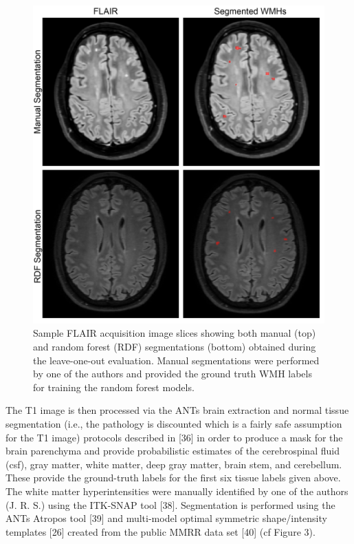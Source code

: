 \documentclass[11pt,]{article}
\begin{document}
\begin{figure}[htbp]
\centering
\includegraphics{Figures/montage.png}
\caption{Sample FLAIR acquisition image slices showing both manual (top)
and random forest (RDF) segmentations (bottom) obtained during the
leave-one-out evaluation. Manual segmentations were performed by one of
the authors and provided the ground truth WMH labels for training the
random forest models.}
\end{figure}

The T1 image is then processed via the ANTs brain extraction and normal
tissue segmentation (i.e., the pathology is discounted which is a fairly
safe assumption for the T1 image) protocols described in {[}36{]} in
order to produce a mask for the brain parenchyma and provide
probabilistic estimates of the cerebrospinal fluid (csf), gray matter,
white matter, deep gray matter, brain stem, and cerebellum. These
provide the ground-truth labels for the first six tissue labels given
above. The white matter hyperintensities were manually identified by one
of the authors (J. R. S.) using the ITK-SNAP tool {[}38{]}. Segmentation
is performed using the ANTs Atropos tool {[}39{]} and multi-model
optimal symmetric shape/intensity templates {[}26{]} created from the
public MMRR data set {[}40{]} (cf Figure 3).
\end{document}
